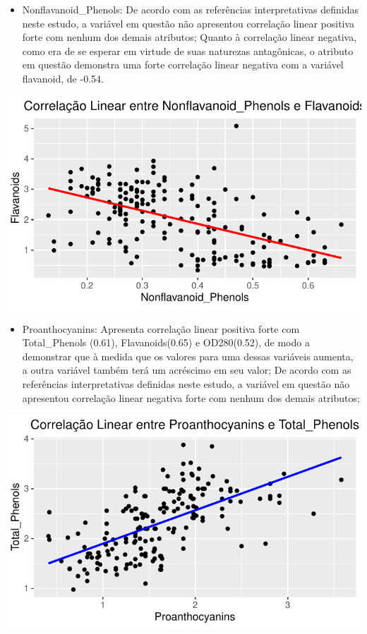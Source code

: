 \documentclass[
  letterpaper,
  DIV=11,
  numbers=noendperiod]{scrartcl}
\providecommand{\tightlist}{%
  \setlength{\itemsep}{0pt}\setlength{\parskip}{0pt}}\usepackage{longtable,booktabs,array}
\begin{document}
\begin{itemize}
\tightlist
\item
  Nonflavanoid\_Phenols: De acordo com as referências interpretativas
  definidas neste estudo, a variável em questão não apresentou
  correlação linear positiva forte com nenhum dos demais atributos;
  Quanto à correlação linear negativa, como era de se esperar em virtude
  de suas naturezas antagônicas, o atributo em questão demonstra uma
  forte correlação linear negativa com a variável flavanoid, de -0.54.
\end{itemize}

\begin{center}
\includegraphics{wines_analysis_files/figure-pdf/unnamed-chunk-12-1.pdf}
\end{center}

\begin{itemize}
\tightlist
\item
  Proanthocyanins: Apresenta correlação linear positiva forte com
  Total\_Phenols (0.61), Flavanoids(0.65) e OD280(0.52), de modo a
  demonstrar que à medida que os valores para uma dessas variáveis
  aumenta, a outra variável também terá um acréscimo em seu valor; De
  acordo com as referências interpretativas definidas neste estudo, a
  variável em questão não apresentou correlação linear negativa forte
  com nenhum dos demais atributos;
\end{itemize}

\begin{center}
\includegraphics{wines_analysis_files/figure-pdf/unnamed-chunk-13-1.pdf}
\end{center}
\end{document}
